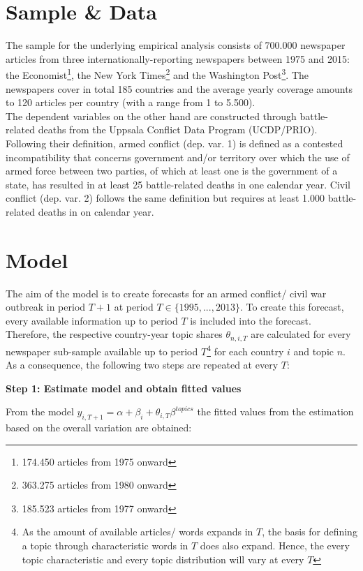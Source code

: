 \section{Sample \& Data}

The sample for the underlying empirical analysis consists of 700.000 newspaper articles from three internationally-reporting newspapers between 1975 and 2015: the Economist\footnote{174.450 articles from 1975 onward}, the New York Times\footnote{363.275 articles from 1980 onward} and the Washington Post\footnote{185.523 articles from 1977 onward}.
The newspapers cover in total 185 countries and the average yearly coverage amounts to 120 articles per country (with a range from 1 to 5.500). \\
The dependent variables on the other hand are constructed through battle-related deaths from the Uppsala Conflict Data Program (UCDP/PRIO). Following their definition, armed conflict (dep. var. 1) is defined as a contested incompatibility that concerns government and/or territory over which the use of armed force between two parties, of which at least one is the government of a state, has resulted in at least 25 battle-related deaths in one calendar year. Civil conflict (dep. var. 2) follows the same definition but requires at least 1.000 battle-related deaths in on calendar year. 




\section{Model}
The aim of the model is to create forecasts for an armed conflict/ civil war outbreak in period $T+1$ at period $T \in \{1995,..., 2013\}$. To create this forecast, every available information up to period $T$ is included into the forecast. Therefore, the respective country-year topic shares $\theta_{n,i,T}$ are calculated for every newspaper sub-sample available up to period $T$\footnote{As the amount of available articles/ words expands in $T$, the basis for defining a topic through characteristic words in $T$ does also expand. Hence, the every topic characteristic and every topic distribution will vary at every $T$} for each country $i$ and topic $n$. As a consequence, the following two steps are repeated at every $T$:

\noindent\textbf{Step 1: Estimate model and obtain fitted values}

\noindent From the model $y_{i,T+1} = \alpha + \beta_{i} + \theta_{i,T}\beta^{topics}$ the fitted values from the estimation based on the overall variation are obtained: 

